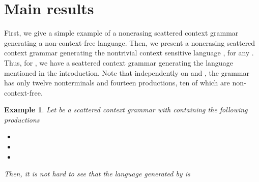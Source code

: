 \documentclass[copyright]{eptcs}
\makeatletter
\newtheorem{example}[theorem]{Example\dromanb}
\newcommand*{\dromanb}{\gdef\d@tstyle{\rmfamily\upshape\mdseries}}
\newcommand{\d@tstyle}{}
\makeatother
\begin{document}
\section{Main results}
  First, we give a simple example of a nonerasing scattered context grammar generating a non\mbox{-}context-free language. Then, we present a nonerasing scattered context grammar generating the nontrivial context sensitive language , for any . Thus, for , we have a scattered context grammar generating the language mentioned in the introduction. Note that independently on  and , the grammar has only twelve nonterminals and fourteen productions, ten of which are non-context-free.
  \begin{example}
    Let  be a scattered context grammar with  containing the following productions
    \begin{itemize}
      \item 
      \item 
      \item 
    \end{itemize}
    Then, it is not hard to see that the language generated by  is 
    
  \end{example}
\end{document}
